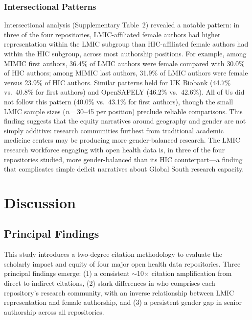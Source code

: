 \documentclass[11pt]{article}
\begin{document}
\subsubsection{Intersectional Patterns}

Intersectional analysis (Supplementary Table~2) revealed a notable pattern: in three of the four repositories, LMIC-affiliated female authors had higher representation within the LMIC subgroup than HIC-affiliated female authors had within the HIC subgroup, across most authorship positions.
For example, among MIMIC first authors, 36.4\% of LMIC authors were female compared with 30.0\% of HIC authors; among MIMIC last authors, 31.9\% of LMIC authors were female versus 23.9\% of HIC authors.
Similar patterns held for UK Biobank (44.7\% vs.\ 40.8\% for first authors) and OpenSAFELY (46.2\% vs.\ 42.6\%).
All of Us did not follow this pattern (40.0\% vs.\ 43.1\% for first authors), though the small LMIC sample sizes (\textit{n}\,=\,30--45 per position) preclude reliable comparisons.
This finding suggests that the equity narratives around geography and gender are not simply additive: research communities furthest from traditional academic medicine centers may be producing more gender-balanced research.
The LMIC research workforce engaging with open health data is, in three of the four repositories studied, more gender-balanced than its HIC counterpart---a finding that complicates simple deficit narratives about Global South research capacity.




\section{Discussion}
\label{sec:discussion}

\subsection{Principal Findings}

This study introduces a two-degree citation methodology to evaluate the scholarly impact and equity of four major open health data repositories.
Three principal findings emerge: (1) a consistent ${\sim}$10$\times$ citation amplification from direct to indirect citations, (2) stark differences in who comprises each repository's research community, with an inverse relationship between LMIC representation and female authorship, and (3) a persistent gender gap in senior authorship across all repositories.
\end{document}
